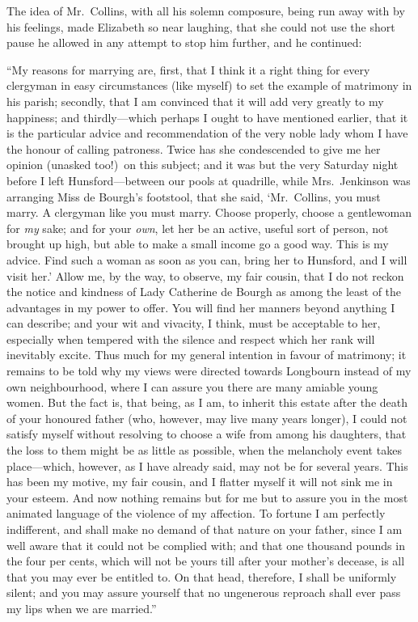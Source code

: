 \documentclass[12pt,english]{book}
\begin{document}
The idea of Mr.\ Collins, with all his solemn composure, being run
away with by his feelings, made Elizabeth so near laughing, that she
could not use the short pause he allowed in any attempt to stop him
further, and he continued:

{}``My reasons for marrying are, first, that I think it a right thing
for every clergyman in easy circumstances (like myself) to set the
example of matrimony in his parish; secondly, that I am convinced
that it will add very greatly to my happiness; and thirdly\mbox{---}which
perhaps I ought to have mentioned earlier, that it is the particular
advice and recommendation of the very noble lady whom I have the honour
of calling patroness. Twice has she condescended to give me her opinion
(unasked too!)\ on this subject; and it was but the very Saturday
night before I left Hunsford\mbox{--}--between our pools at quadrille,
while Mrs.\ Jenkinson was arranging Miss de Bourgh's footstool, that
she said, `Mr.\ Collins, you must marry. A clergyman like you must
marry. Choose properly, choose a gentlewoman for \textit{my} sake;
and for your \textit{own}, let her be an active, useful sort of person,
not brought up high, but able to make a small income go a good way.
This is my advice. Find such a woman as soon as you can, bring her
to Hunsford, and I will visit her.' Allow me, by the way, to observe,
my fair cousin, that I do not reckon the notice and kindness of Lady
Catherine de Bourgh as among the least of the advantages in my power
to offer. You will find her manners beyond anything I can describe;
and your wit and vivacity, I think, must be acceptable to her, especially
when tempered with the silence and respect which her rank will inevitably
excite. Thus much for my general intention in favour of matrimony;
it remains to be told why my views were directed towards Longbourn
instead of my own neighbourhood, where I can assure you there are
many amiable young women. But the fact is, that being, as I am, to
inherit this estate after the death of your honoured father (who,
however, may live many years longer), I could not satisfy myself without
resolving to choose a wife from among his daughters, that the loss
to them might be as little as possible, when the melancholy event
takes place\mbox{---}which, however, as I have already said, may
not be for several years. This has been my motive, my fair cousin,
and I flatter myself it will not sink me in your esteem. And now nothing
remains but for me but to assure you in the most animated language
of the violence of my affection. To fortune I am perfectly indifferent,
and shall make no demand of that nature on your father, since I am
well aware that it could not be complied with; and that one thousand
pounds in the four per cents, which will not be yours till after your
mother's decease, is all that you may ever be entitled to. On that
head, therefore, I shall be uniformly silent; and you may assure yourself
that no ungenerous reproach shall ever pass my lips when we are married.''
\end{document}
